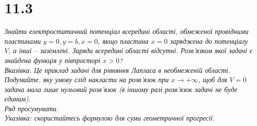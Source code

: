 


%


\section[Задача №11.3]{11.3}

\textit{Знайти електростатичний потенціал всередині області, обмеженої провідними пластинами $y=0, y=b, x=0$, якщо пластина $x=0$ заряджена до потенціалу $V$, а інші -- заземлені. Заряди всередині області відсутні. Розв’язком якої задачі є знайдена функція у півпросторі $x>0$?\\
Вказівка. Це приклад задачі для рівняння Лапласа в необмеженій області. Подумайте, яку умову слід накласти на розв’язок при
$x \to +\infty$, щоб для $V=0$ задача мала лише нульовий розв’язок (в іншому разі розв’язок задачі не буде єдиним).\\
Ряд просумувати.\\
Указівка: скористайтесь формулою для суми геометричної прогресії.}


%